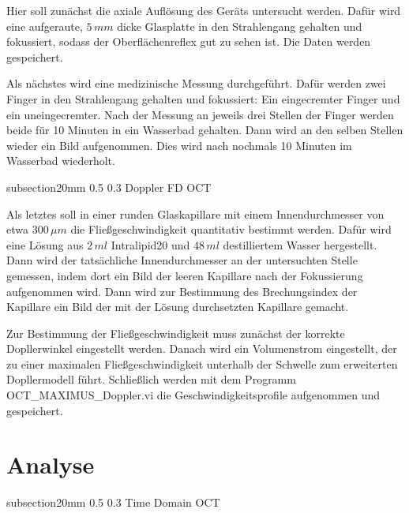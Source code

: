 \documentclass[german, %
parskip=full, %
bibliography=totoc, %
]{scrartcl}
\makeatletter
\renewcommand\subsection{\@startsection 
   {subsection}{2}{0mm}%
   {0.5\baselineskip}%
   {0.3\baselineskip}%
   {\bfseries\sffamily\large}%
   }
\makeatother
\begin{document}
Hier soll zunächst die axiale Auflösung des Geräts untersucht werden. Dafür wird eine aufgeraute, $5\,mm$ dicke Glasplatte in den Strahlengang gehalten und fokussiert, sodass der Oberflächenreflex gut zu sehen ist. Die Daten werden gespeichert.

Als nächstes wird eine medizinische Messung durchgeführt. Dafür werden zwei Finger in den Strahlengang gehalten und fokussiert: Ein eingecremter Finger und ein uneingecremter. Nach der Messung an jeweils drei Stellen der Finger werden beide für 10 Minuten in ein Wasserbad gehalten. Dann wird an den selben Stellen wieder ein Bild aufgenommen. Dies wird nach nochmals 10 Minuten im Wasserbad wiederholt.

\subsection{Doppler FD OCT}

Als letztes soll in einer runden Glaskapillare mit einem Innendurchmesser von etwa $300\, \mu m$ die Fließgeschwindigkeit quantitativ bestimmt werden. Dafür wird eine Lösung aus $2\,ml$ Intralipid20 und $48\,ml$ destilliertem Wasser hergestellt. Dann wird der tatsächliche Innendurchmesser an der untersuchten Stelle gemessen, indem dort ein Bild der leeren Kapillare nach der Fokussierung aufgenommen wird. Dann wird zur Bestimmung des Brechungsindex der Kapillare ein Bild der mit der Lösung durchsetzten Kapillare gemacht. 

Zur Bestimmung der Fließgeschwindigkeit muss zunächst der korrekte Dopllerwinkel eingestellt werden. Danach wird ein Volumenstrom eingestellt, der zu einer maximalen Fließgeschwindigkeit unterhalb der Schwelle zum erweiterten Dopllermodell führt. Schließlich werden mit dem Programm OCT\_MAXIMUS\_Doppler.vi die Geschwindigkeitsprofile aufgenommen und gespeichert. 

\section{Analyse}

\subsection{Time Domain OCT}
\end{document}
